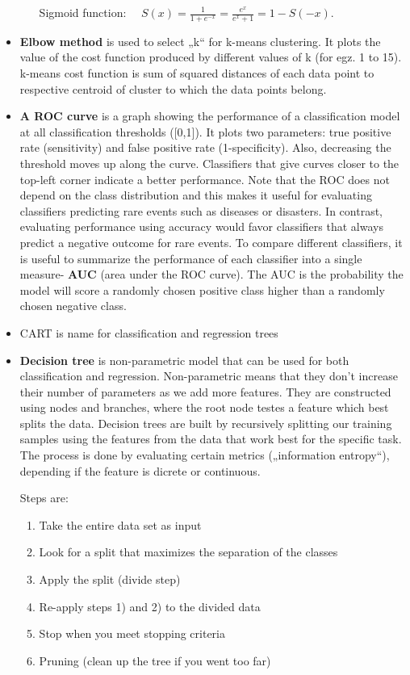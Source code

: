 \documentclass[
  letterpaper,
  DIV=11,
  numbers=noendperiod]{scrreprt}
\providecommand{\tightlist}{%
  \setlength{\itemsep}{0pt}\setlength{\parskip}{0pt}}\usepackage{longtable,booktabs,array}
\begin{document}
\begin{itemize}
\begin{itemize}
    Sigmoid function:
    \(\quad S(x) = \frac{1}{1 + e^{-x}} = \frac{e^{x}}{e^{x} + 1} = 1 - S(-x).\)
  \end{itemize}
\item
  \textbf{Elbow method} is used to select „k`` for k-means clustering.
  It plots the value of the cost function produced by different values
  of k (for egz. 1 to 15). k-means cost function is sum of squared
  distances of each data point to respective centroid of cluster to
  which the data points belong.
\item
  \textbf{A ROC curve} is a graph showing the performance of a
  classification model at all classification thresholds ({[}0,1{]}). It
  plots two parameters: true positive rate (sensitivity) and false
  positive rate (1-specificity). Also, decreasing the threshold moves up
  along the curve. Classifiers that give curves closer to the top-left
  corner indicate a better performance. Note that the ROC does not
  depend on the class distribution and this makes it useful for
  evaluating classifiers predicting rare events such as diseases or
  disasters. In contrast, evaluating performance using accuracy would
  favor classifiers that always predict a negative outcome for rare
  events. To compare different classifiers, it is useful to summarize
  the performance of each classifier into a single measure- \textbf{AUC}
  (area under the ROC curve). The AUC is the probability the model will
  score a randomly chosen positive class higher than a randomly chosen
  negative class.
\item
  CART is name for classification and regression trees
\item
  \textbf{Decision tree} is non-parametric model that can be used for
  both classification and regression. Non-parametric means that they
  don't increase their number of parameters as we add more features.
  They are constructed using nodes and branches, where the root node
  testes a feature which best splits the data. Decision trees are built
  by recursively splitting our training samples using the features from
  the data that work best for the specific task. The process is done by
  evaluating certain metrics („information entropy``), depending if the
  feature is dicrete or continuous.

  Steps are:

  \begin{enumerate}
  \def\labelenumi{\arabic{enumi}.}
  \tightlist
  \item
    Take the entire data set as input
  \item
    Look for a split that maximizes the separation of the classes
  \item
    Apply the split (divide step)
  \item
    Re-apply steps 1) and 2) to the divided data
  \item
    Stop when you meet stopping criteria
  \item
    Pruning (clean up the tree if you went too far)
  \end{enumerate}


\end{itemize}
\end{document}
